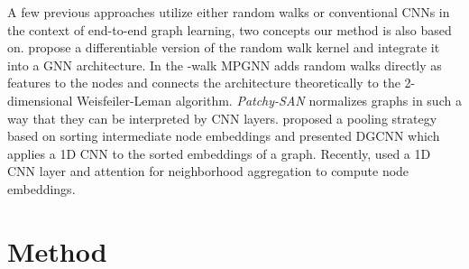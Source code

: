 \documentclass{scrartcl} \usepackage[dvipsnames]{xcolor}
\begin{document}
A few previous approaches utilize either random walks or conventional CNNs in the context of end-to-end graph learning, two concepts our method is also based on.
\citet{DBLP:conf/nips/NikolentzosV20} propose a differentiable version of the random walk kernel and integrate it into a GNN architecture.
In \cite{geerts2020walk} the -walk MPGNN adds random walks directly as features to the nodes and connects the architecture theoretically to the 2-dimensional Weisfeiler-Leman algorithm.
\emph{Patchy-SAN} \cite{Nie+2016} normalizes graphs in such a way that they can be interpreted by CNN layers.
\citet{zhang2018end} proposed a pooling strategy based on sorting intermediate node embeddings and presented DGCNN which applies a 1D CNN to the sorted embeddings of a graph.
Recently, \citet{yuan2021node2seq} used a 1D CNN layer and attention for neighborhood aggregation to compute node embeddings.




















    






















 \section{Method}
    \label{method}
    
\end{document}
